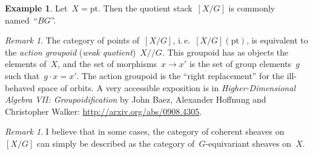 \documentclass[a4paper,english,12pt]{scrartcl}
\theoremstyle{definition}
\newtheorem{ex}[defn]{Example}
\theoremstyle{plain}
\theoremstyle{remark}
\newtheorem{rem}[defn]{Remark}
\newcommand{\pt}{\mathrm{pt}}
\begin{document}
\begin{ex}Let~$X = \pt$. Then the quotient stack~$[X/G]$ is commonly
named~``$BG$''.\end{ex}

\begin{rem}The category of points of~$[X/G]$, i.\,e.\@~$[X/G](\pt)$,
is equivalent to the \emph{action groupoid} (\emph{weak quotient})~$X/\!/G$.
This groupoid has as objects the elements of~$X$, and the set of morphisms~$x
\to x'$ is the set of group elements~$g$ such that~$g \cdot x = x'$.
The action groupoid is the ``right replacement'' for the ill-behaved space of
orbits. A very accessible exposition is in \emph{Higher-Dimensional Algebra
VII: Groupoidification} by John Baez, Alexander Hoffnung and Christopher
Walker: \url{http://arxiv.org/abs/0908.4305}.
\end{rem}

\begin{rem}I believe that in some cases, the category of coherent sheaves
on~$[X/G]$ can simply be described as the category of~$G$-equivariant sheaves
on~$X$.
\end{rem}
\end{document}
